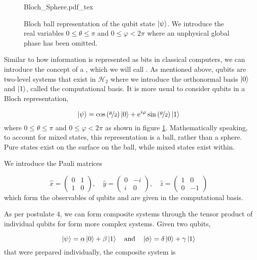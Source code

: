 \begin{figure}
	\centering
	\def\svgwidth{0.5\textwidth}
   	{Bloch_Sphere.pdf_tex}
   	\caption[Bloch ball representation of a qubit]{Bloch ball representation of the qubit state $\ket{\psi}$. We introduce the real variables $0\le\theta\le\pi$ and $0\le\varphi<2\pi$ where an unphysical global phase has been omitted.}
   	\label{fig:bloch}
\end{figure}

Similar to how information is represented as bits in classical computers, we can introduce the concept of a , which we will call . As mentioned above, qubits are two-level systems that exist in $\mathcal{H}_2$ where we introduce the orthonormal basis $\ket{0}$ and $\ket{1}$, called the computational basis. It is more usual to consider qubits in a Bloch representation,

\begin{equation}
	\ket{\psi} = \cos\left(\nicefrac{\theta}{2}\right)\ket{0} + \mathrm{e}^{i\varphi}\sin\left(\nicefrac{\theta}{2}\right)\ket{1}
\end{equation}
where $0\le\theta\le\pi$ and $0\le\varphi<2\pi$ as shown in figure \ref{fig:bloch}. Mathematically speaking, to account for mixed states, this representation is a ball, rather than a sphere. Pure states exist on the surface on the ball, while mixed states exist within.

We introduce the Pauli matrices

\begin{equation}
	\hat{x} = \left(\begin{matrix}
		0 & 1 \\
		1 & 0
	\end{matrix}\right),
	\quad
	\hat{y} = \left(\begin{matrix}
		0 & -i \\
		i & 0
	\end{matrix}\right),
	\quad
	\hat{z} = \left(\begin{matrix}
		1 & 0 \\
		0 & -1
	\end{matrix}\right)
\end{equation}
which form the observables of qubits and are given in the computational basis. 

As per postulate 4, we can form composite systems through the tensor product of individual qubits for form more complex systems. Given two qubits,

\begin{equation}
	\ket{\psi} = \alpha\ket{0} + \beta\ket{1} \quad \text{and} \quad \ket{\phi} = \delta\ket{0} + \gamma\ket{1}
\end{equation} 
that were prepared individually, the composite system is

